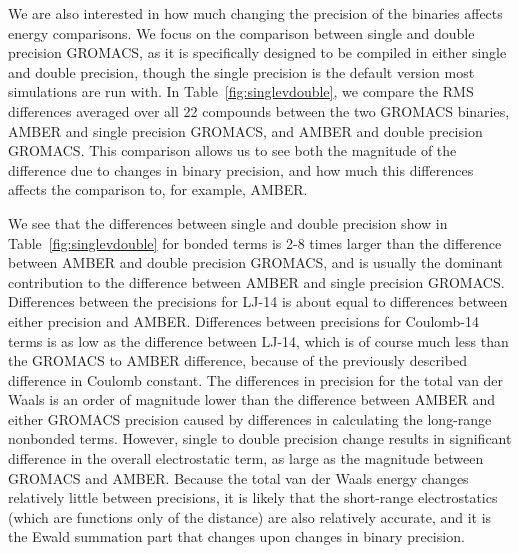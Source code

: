 We are also interested in how much changing the precision of the
binaries affects energy comparisons.  We focus on the comparison
between single and double precision GROMACS, as it is specifically
designed to be compiled in either single and double precision, though
the single precision is the default version most simulations are run
with. In Table~\ref{fig:singlevdouble}, we compare the RMS differences
averaged over all 22 compounds between the two GROMACS binaries, AMBER
and single precision GROMACS, and AMBER and double precision GROMACS.
This comparison allows us to see both the magnitude of the difference
due to changes in binary precision, and how much this differences
affects the comparison to, for example, AMBER.

We see that the differences between single and double precision show
in Table~\ref{fig:singlevdouble} for bonded terms is 2-8 times larger
than the difference between AMBER and double precision GROMACS, and is
usually the dominant contribution to the difference between AMBER and
single precision GROMACS.  Differences between the precisions for
LJ-14 is about equal to differences between either precision and
AMBER.  Differences between precisions for Coulomb-14 terms is as low
as the difference between LJ-14, which is of course much less than the
GROMACS to AMBER difference, because of the previously described
difference in Coulomb constant. The differences in precision for the
total van der Waals is an order of magnitude lower than the difference
between AMBER and either GROMACS precision caused by differences in
calculating the long-range nonbonded terms.  However, single to double
precision change results in significant difference in the overall
electrostatic term, as large as the magnitude between GROMACS and
AMBER.  Because the total van der Waals energy changes relatively
little between precisions, it is likely that the short-range
electrostatics (which are functions only of the distance) are also
relatively accurate, and it is the Ewald summation part that changes
upon changes in binary precision.

